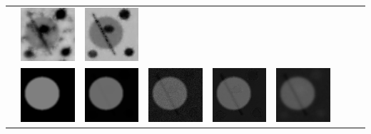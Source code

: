 \begin{tabular}{M{0.02cm}*{8}{M{2.5cm}}}
        &\includegraphics[width=\figurelength]{img/chapitre3/figure7/maps/img_8_1.png}
        &\includegraphics[width=\figurelength]{img/chapitre3/figure7/maps/img_9_1.png}\\
        &\includegraphics[width=\figurelength]{img/chapitre3/figure7/maps/img_1_2.png}
        &\includegraphics[width=\figurelength]{img/chapitre3/figure7/maps/img_2_2.png}
        &\includegraphics[width=\figurelength]{img/chapitre3/figure7/maps/img_3_2.png}
        &\includegraphics[width=\figurelength]{img/chapitre3/figure7/maps/img_4_2.png}
        &\includegraphics[width=\figurelength]{img/chapitre3/figure7/maps/img_6_2.png}

\end{tabular}
